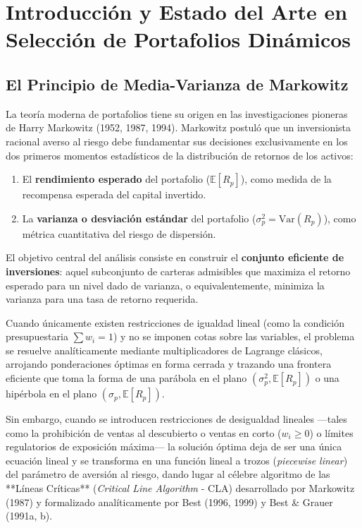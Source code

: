 \documentclass[11pt,a4paper]{report}
\numberwithin{equation}{chapter}
\begin{document}
\chapter{Introducción y Estado del Arte en Selección de Portafolios Dinámicos}

\section{El Principio de Media-Varianza de Markowitz}

La teoría moderna de portafolios tiene su origen en las investigaciones pioneras de Harry Markowitz (1952, 1987, 1994). Markowitz postuló que un inversionista racional averso al riesgo debe fundamentar sus decisiones exclusivamente en los dos primeros momentos estadísticos de la distribución de retornos de los activos:
\begin{enumerate}
    \item El \textbf{rendimiento esperado} del portafolio ($\mathbb{E}[R_p]$), como medida de la recompensa esperada del capital invertido.
    \item La \textbf{varianza o desviación estándar} del portafolio ($\sigma_p^2 = \mathrm{Var}(R_p)$), como métrica cuantitativa del riesgo de dispersión.
\end{enumerate}

El objetivo central del análisis consiste en construir el \textbf{conjunto eficiente de inversiones}: aquel subconjunto de carteras admisibles que maximiza el retorno esperado para un nivel dado de varianza, o equivalentemente, minimiza la varianza para una tasa de retorno requerida. 

Cuando únicamente existen restricciones de igualdad lineal (como la condición presupuestaria $\sum w_i = 1$) y no se imponen cotas sobre las variables, el problema se resuelve analíticamente mediante multiplicadores de Lagrange clásicos, arrojando ponderaciones óptimas en forma cerrada y trazando una frontera eficiente que toma la forma de una parábola en el plano $(\sigma_p^2, \mathbb{E}[R_p])$ o una hipérbola en el plano $(\sigma_p, \mathbb{E}[R_p])$.

Sin embargo, cuando se introducen restricciones de desigualdad lineales —tales como la prohibición de ventas al descubierto o ventas en corto ($w_i \ge 0$) o límites regulatorios de exposición máxima— la solución óptima deja de ser una única ecuación lineal y se transforma en una función lineal a trozos (\emph{piecewise linear}) del parámetro de aversión al riesgo, dando lugar al célebre algoritmo de las **Líneas Críticas** (\emph{Critical Line Algorithm} - CLA) desarrollado por Markowitz (1987) y formalizado analíticamente por Best (1996, 1999) y Best \& Grauer (1991a, b). 
\end{document}
